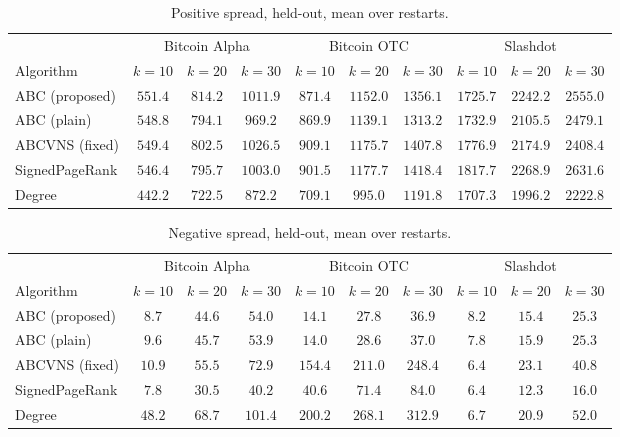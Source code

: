 \documentclass[journal,letterpaper,10pt]{IEEEtran}
\begin{document}
\begin{table}[!t]
\centering
\caption{Positive spread, held-out, mean over restarts.}
\label{tab:pos}
\scriptsize
\setlength{\tabcolsep}{3.5pt}
\begin{tabular}{@{}lccccccccc@{}}
\toprule
& \multicolumn{3}{c}{Bitcoin Alpha} & \multicolumn{3}{c}{Bitcoin OTC} & \multicolumn{3}{c}{Slashdot}\\
\cmidrule(lr){2-4}\cmidrule(lr){5-7}\cmidrule(lr){8-10}
Algorithm & $k{=}10$ & $k{=}20$ & $k{=}30$ & $k{=}10$ & $k{=}20$ & $k{=}30$ & $k{=}10$ & $k{=}20$ & $k{=}30$\\
\midrule
ABC (proposed)   & $551.4$ & $814.2$ & $1011.9$ & $871.4$ & $1152.0$ & $1356.1$ & $1725.7$ & $2242.2$ & $2555.0$\\
ABC (plain)      & $548.8$ & $794.1$ & $969.2$  & $869.9$ & $1139.1$ & $1313.2$ & $1732.9$ & $2105.5$ & $2479.1$\\
ABCVNS (fixed)   & $549.4$ & $802.5$ & $1026.5$ & $909.1$ & $1175.7$ & $1407.8$ & $1776.9$ & $2174.9$ & $2408.4$\\
SignedPageRank   & $546.4$ & $795.7$ & $1003.0$ & $901.5$ & $1177.7$ & $1418.4$ & $1817.7$ & $2268.9$ & $2631.6$\\
Degree           & $442.2$ & $722.5$ & $872.2$  & $709.1$ & $995.0$  & $1191.8$ & $1707.3$ & $1996.2$ & $2222.8$\\
\bottomrule
\end{tabular}
\end{table}

\begin{table}[!t]
\centering
\caption{Negative spread, held-out, mean over restarts.}
\label{tab:neg}
\scriptsize
\setlength{\tabcolsep}{3.5pt}
\begin{tabular}{@{}lccccccccc@{}}
\toprule
& \multicolumn{3}{c}{Bitcoin Alpha} & \multicolumn{3}{c}{Bitcoin OTC} & \multicolumn{3}{c}{Slashdot}\\
\cmidrule(lr){2-4}\cmidrule(lr){5-7}\cmidrule(lr){8-10}
Algorithm & $k{=}10$ & $k{=}20$ & $k{=}30$ & $k{=}10$ & $k{=}20$ & $k{=}30$ & $k{=}10$ & $k{=}20$ & $k{=}30$\\
\midrule
ABC (proposed)   & $8.7$  & $44.6$ & $54.0$ & $14.1$ & $27.8$ & $36.9$ & $8.2$ & $15.4$ & $25.3$\\
ABC (plain)      & $9.6$  & $45.7$ & $53.9$ & $14.0$ & $28.6$ & $37.0$ & $7.8$ & $15.9$ & $25.3$\\
ABCVNS (fixed)   & $10.9$ & $55.5$ & $72.9$ & $154.4$ & $211.0$ & $248.4$ & $6.4$ & $23.1$ & $40.8$\\
SignedPageRank   & $7.8$  & $30.5$ & $40.2$ & $40.6$ & $71.4$ & $84.0$ & $6.4$ & $12.3$ & $16.0$\\
Degree           & $48.2$ & $68.7$ & $101.4$ & $200.2$ & $268.1$ & $312.9$ & $6.7$ & $20.9$ & $52.0$\\
\bottomrule
\end{tabular}
\end{table}
\end{document}
